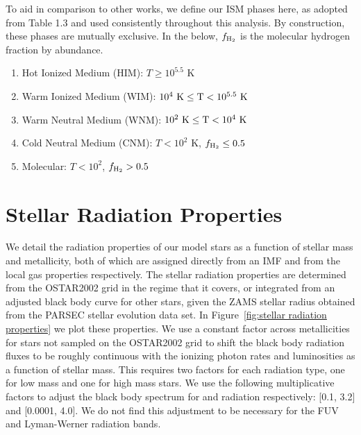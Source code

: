 \documentclass[twocolumn]{aastex61}
\begin{document}
To aid in comparison to other works, we define our ISM phases here, as adopted from \citet{Draine2011} Table 1.3 and used consistently throughout this analysis. By construction, these phases are mutually exclusive. In the below, $f_{\rm H_2}$ is the molecular hydrogen fraction by abundance.

\begin{enumerate}
\item Hot Ionized Medium (HIM): $T \geq 10^{5.5}$ K
\item Warm Ionized Medium (WIM): $10^{4}~\rm{K} \leq T < 10^{5.5}~\rm{K} $
\item Warm Neutral Medium (WNM): $10^{2}~\rm{K} \leq T < 10^{4}~ \rm{K}$
\item Cold Neutral Medium (CNM): $T < 10^2$ K, $f_{\rm H_2} \leq 0.5$
\item Molecular: $T < 10^2$, $f_{\rm H_2} > 0.5$
\end{enumerate}

\section{Stellar Radiation Properties}
\label{appendix:radiation}
We detail the radiation properties of our model stars as a function of stellar mass and metallicity, both of which are assigned directly from an IMF and from the local gas properties respectively. The stellar radiation properties are determined from the OSTAR2002 grid \citep{Lanz2003} in the regime that it covers, or integrated from an adjusted black body curve 
    for other stars,
given the ZAMS stellar radius obtained from the PARSEC \citep{Bressan2012,Tang2014} stellar evolution data set. In Figure~\ref{fig:stellar radiation properties} we plot these properties. We use a constant factor across metallicities for stars not sampled on the OSTAR2002 grid to shift the black body radiation fluxes to be roughly continuous with the ionizing photon rates and luminosities as a function of stellar mass. This requires two factors for each radiation type, one for low mass and one for high mass stars. We use the following multiplicative factors to adjust the black body spectrum for  and  radiation respectively: [0.1, 3.2] and [0.0001, 4.0]. We do not find this adjustment to be necessary for the FUV and Lyman-Werner radiation bands.
\end{document}
